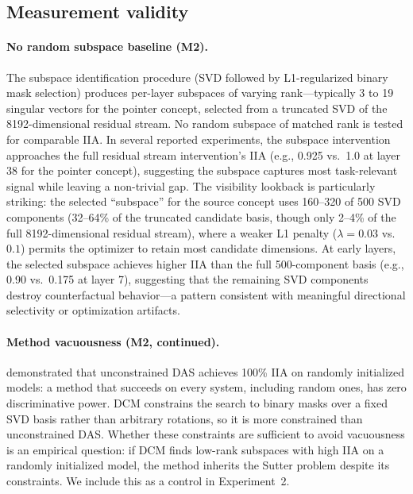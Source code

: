 \documentclass[11pt]{article}
\begin{document}
\subsection{Measurement validity}

\paragraph{No random subspace baseline (M2).}
The subspace identification procedure (SVD followed by L1-regularized binary mask selection) produces per-layer subspaces of varying rank---typically 3 to 19 singular vectors for the pointer concept, selected from a truncated SVD of the 8192-dimensional residual stream. No random subspace of matched rank is tested for comparable IIA. In several reported experiments, the subspace intervention approaches the full residual stream intervention's IIA (e.g., 0.925 vs.\ 1.0 at layer 38 for the pointer concept), suggesting the subspace captures most task-relevant signal while leaving a non-trivial gap. The visibility lookback is particularly striking: the selected ``subspace'' for the source concept uses 160--320 of 500 SVD components (32--64\% of the truncated candidate basis, though only 2--4\% of the full 8192-dimensional residual stream), where a weaker L1 penalty ($\lambda = 0.03$ vs.\ $0.1$) permits the optimizer to retain most candidate dimensions. At early layers, the selected subspace achieves higher IIA than the full 500-component basis (e.g., 0.90 vs.\ 0.175 at layer 7), suggesting that the remaining SVD components destroy counterfactual behavior---a pattern consistent with meaningful directional selectivity or optimization artifacts.

\paragraph{Method vacuousness (M2, continued).}
\citet{sutter2025vacuous} demonstrated that unconstrained DAS achieves 100\% IIA on randomly initialized models: a method that succeeds on every system, including random ones, has zero discriminative power. DCM constrains the search to binary masks over a fixed SVD basis rather than arbitrary rotations, so it is more constrained than unconstrained DAS. Whether these constraints are sufficient to avoid vacuousness is an empirical question: if DCM finds low-rank subspaces with high IIA on a randomly initialized model, the method inherits the Sutter problem despite its constraints. We include this as a control in Experiment~2.
\end{document}
